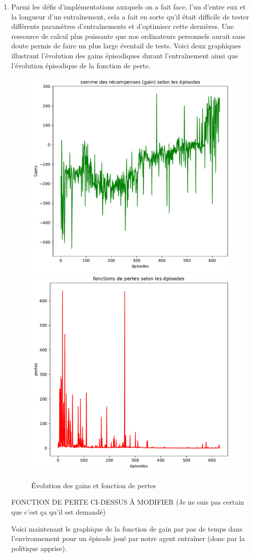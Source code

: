 \documentclass[letterpaper,11pt]{article}
\begin{document}
\begin{enumerate}[label=(\alph*)]
\item Parmi les défis d'implémentations auxquels on a fait face, l'un d'entre eux et la longueur d'un entraînement, cela a fait en sorte qu'il était difficile de tester différents paramètres d'entraînements et d'optimiser cette dernières. Une ressource de calcul plus puissante que nos ordinateurs personnels aurait sans doute permis de faire un plus large éventail de tests. Voici deux graphiques illustrant l'évolution des gains épisodiques durant l'entraînement ainsi que l'évolution épisodique de la fonction de perte.

\begin{center}
\begin{figure}[H]
\caption{Évolution des gains et fonction de pertes}
\includegraphics[width=0.45\linewidth]{gains.pdf} \hfill \includegraphics[width=0.45\linewidth]{pertes.pdf}
\end{figure}
\end{center}

FONCTION DE PERTE CI-DESSUS À MODIFIER (Je ne suis pas certain que c'est ça qu'il est demandé)

Voici maintenant le graphique de la fonction de gain par pas de temps dans l'environnement pour un épisode joué par notre agent entraîner (donc par la politique apprise).
 

\end{enumerate}
\end{document}

